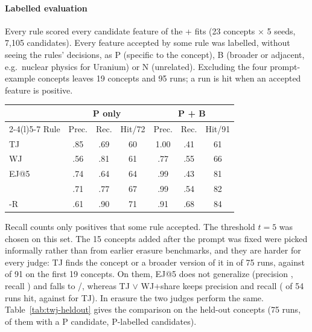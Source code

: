\paragraph{Labelled evaluation}
Every rule scored every candidate feature of the \cs{}+\gs{} fits (23 concepts $\times$ 5 seeds, 7{,}105 candidates).
Every feature accepted by some rule was labelled, without seeing the rules' decisions, as P (specific to the concept), B (broader or adjacent, e.g.\ nuclear physics for Uranium) or N (unrelated).
Excluding the four prompt-example concepts leaves 19 concepts and 95 runs; a run is hit when an accepted feature is positive.

\begin{center}
\small
\setlength{\tabcolsep}{2.5pt}
\begin{tabular}{@{}lcccccc@{}}
\toprule
 & \multicolumn{3}{c}{P only} & \multicolumn{3}{c}{P + B} \\
\cmidrule(lr){2-4}\cmidrule(l){5-7}
Rule & Prec. & Rec. & Hit/72 & Prec. & Rec. & Hit/91 \\
\midrule
TJ & .85 & .69 & 60 & 1.00 & .41 & 61 \\
WJ & .56 & .81 & 61 & .77 & .55 & 66 \\
EJ@5 & .74 & .64 & 64 & .99 & .43 & 81 \\
\twj{} & .71 & .77 & 67 & .99 & .54 & 82 \\
\twj{}-R & .61 & .90 & 71 & .91 & .68 & 84 \\
\bottomrule
\end{tabular}
\end{center}

\noindent Recall counts only positives that some rule accepted.
The threshold $t = 5$ was chosen on this set.
The 15 concepts added after the prompt was fixed were picked informally rather than from earlier erasure benchmarks, and they are harder for every judge: TJ finds the concept or a broader version of it in  of 75 runs, against  of 91 on the first 19 concepts.
On them, EJ@5 does not generalize (precision , recall ) and \twj{} falls to /, whereas TJ $\vee$ WJ+share keeps precision  and recall  ( of 54 runs hit, against  for TJ).
In erasure the two judges perform the same.
Table~\ref{tab:twj-heldout} gives the comparison on the held-out concepts (75 runs,  of them with a P candidate,  P-labelled candidates).

